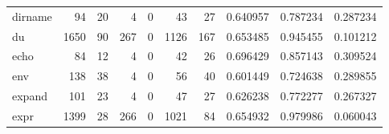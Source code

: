 \begin{tabular}{lrrrrrrrrr}
dirname   &                                                 94 &                                                 20 &                                                  4 &                                                  0 &                                                 43 &                                                 27 &                                           0.640957 &                               0.787234 &                             0.287234 \\
du        &                                               1650 &                                                 90 &                                                267 &                                                  0 &                                               1126 &                                                167 &                                           0.653485 &                               0.945455 &                             0.101212 \\
echo      &                                                 84 &                                                 12 &                                                  4 &                                                  0 &                                                 42 &                                                 26 &                                           0.696429 &                               0.857143 &                             0.309524 \\
env       &                                                138 &                                                 38 &                                                  4 &                                                  0 &                                                 56 &                                                 40 &                                           0.601449 &                               0.724638 &                             0.289855 \\
expand    &                                                101 &                                                 23 &                                                  4 &                                                  0 &                                                 47 &                                                 27 &                                           0.626238 &                               0.772277 &                             0.267327 \\
expr      &                                               1399 &                                                 28 &                                                266 &                                                  0 &                                               1021 &                                                 84 &                                           0.654932 &                               0.979986 &                             0.060043 \\

\end{tabular}

